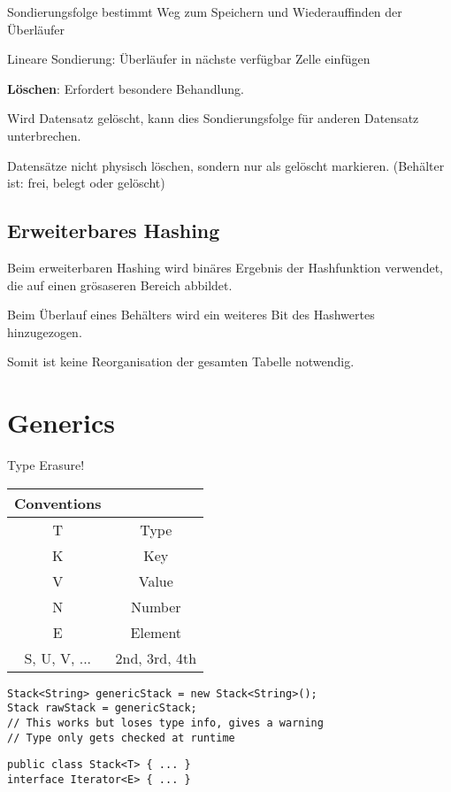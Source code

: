 \begin{multicols*}{4}
		Sondierungsfolge bestimmt Weg zum Speichern und Wiederauffinden der Überläufer
		
		Lineare Sondierung: Überläufer in nächste verfügbar Zelle einfügen
		
		\textbf{Löschen}: Erfordert besondere Behandlung.
		
		Wird Datensatz gelöscht, kann dies Sondierungsfolge für anderen Datensatz unterbrechen.
		
		Datensätze nicht physisch löschen, sondern nur als gelöscht markieren. (Behälter ist: frei, belegt oder gelöscht)
		
	\subsection{Erweiterbares Hashing}
		Beim erweiterbaren Hashing wird binäres Ergebnis der Hashfunktion verwendet, die auf einen grösaseren Bereich abbildet.
		
		Beim Überlauf eines Behälters wird ein weiteres Bit des Hashwertes hinzugezogen.
		
		Somit ist keine Reorganisation der gesamten Tabelle notwendig.

\section{Generics}
Type Erasure!

	\begin{tabular}{c | c}
		\textbf{Conventions} &  \\
		\hline
		T & Type \\
		K & Key \\
		V & Value \\
		N & Number \\
		E & Element \\
		S, U, V, ... & 2nd, 3rd, 4th \\
	\end{tabular}

	\begin{lstlisting}
Stack<String> genericStack = new Stack<String>();
Stack rawStack = genericStack;
// This works but loses type info, gives a warning
// Type only gets checked at runtime
	\end{lstlisting}

\vspace{5pt}

	\begin{lstlisting}
public class Stack<T> { ... }
interface Iterator<E> { ... }


\end{lstlisting}
\end{multicols*}
